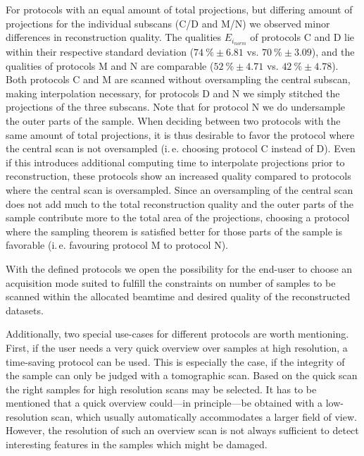 For protocols with an equal amount of total projections, but differing amount of projections for the individual subscans (C/D and M/N) we observed minor differences in reconstruction quality. The qualities $E_{i_{norm}}$ of protocols C and D lie within their respective standard deviation ($\SI{74}{\percent}\pm6.81$ vs. $\SI{70}{\percent}\pm3.09$), and the qualities of protocols M and N are comparable ($\SI{52}{\percent}\pm4.71$ vs. $\SI{42}{\percent}\pm4.78$). Both protocols C and M are scanned without oversampling the central subscan, making interpolation necessary, for protocols D and N we simply stitched the projections of the three subscans. Note that for protocol N we do undersample the outer parts of the sample. When deciding between two protocols with the same amount of total projections, it is thus desirable to favor the protocol where the central scan is not oversampled (i.\,e. choosing protocol C instead of D). Even if this introduces additional computing time to interpolate projections prior to reconstruction, these protocols show an increased quality compared to protocols where the central scan is oversampled. Since an oversampling of the central scan does not add much to the total reconstruction quality and the outer parts of the sample contribute more to the total area of the projections, choosing a protocol where the sampling theorem is satisfied better for those parts of the sample is favorable (i.\,e. favouring protocol M to protocol N).

With the defined protocols we open the possibility for the end-user to choose an acquisition mode suited to fulfill the constraints on number of samples to be scanned within the allocated beamtime and desired quality of the reconstructed datasets.

Additionally, two special use-cases for different protocols are worth mentioning. First, if the user needs a very quick overview over samples at high resolution, a time-saving protocol can be used. This is especially the case, if the integrity of the sample can only be judged with a tomographic scan. Based on the quick scan the right samples for high resolution scans may be selected. It has to be mentioned that a quick overview could---in principle---be obtained with a low-resolution scan, which usually automatically accommodates a larger field of view. However, the resolution of such an overview scan is not always sufficient to detect interesting features in the samples which might be damaged.

